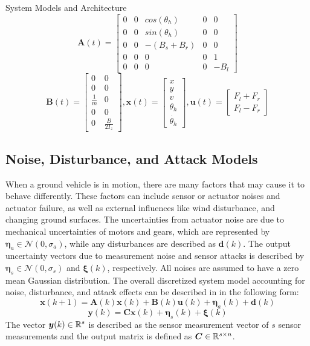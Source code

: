 \begin{section}{System Models and Architecture}
    \begin{equation}
	\bm{A}(t)=\begin{bmatrix} 0 & 0 & cos(\theta_h) & 0 & 0\\ 0 & 0 & sin(\theta_h) & 0 & 0 \\ 0 & 0 & -(B_s+B_r) & 0 & 0 \\ 0 & 0 & 0 & 0 & 1 \\ 0 & 0 & 0 & 0 & -B_l \end{bmatrix} \nonumber
	\end{equation}
	\begin{equation}
	\bm{B}(t)=\begin{bmatrix} 0 & 0 \\ 0 & 0 \\ \frac{1}{m} & 0 \\ 0 & 0 \\ 0 & \frac{B}{2I_z} \end{bmatrix}, 
     \bm{x}(t)=\begin{bmatrix} x \\ y \\ v \\ \theta_h \\ \dot{\theta_h} \end{bmatrix}, \bm{u}(t)= \begin{bmatrix} F_l+F_r \\ F_l-F_r  \end{bmatrix}  \nonumber
	\end{equation}




 \subsection{Noise, Disturbance, and Attack Models}
When a ground vehicle is in motion, there are many factors that may cause it to behave differently. These factors can include sensor or actuator noises and actuator failure, as well as external influences like wind disturbance, and changing ground surfaces. The uncertainties from actuator noise are due to mechanical uncertainties of motors and gears, which are represented by $ \bm{\eta}_a \in \mathcal{N}(0,\sigma_a) $, while any disturbances are described as $\bm{d}(k)$. The output uncertainty vectors due to measurement noise and sensor attacks is described by $ \bm{\eta}_s \in \mathcal{N}(0,\sigma_s) $ and $\bm{\xi}(k)$, respectively. All noises are assumed to have a zero mean Gaussian distribution. The overall discretized system model accounting for noise, disturbance, and attack effects  can be described in in the following form:
    \begin{equation}
	\bm{x}(k+1)=\bm{A}(k)\bm{x}(k)+\bm{B}(k)\bm{u}(k)+\bm{\eta}_a(k)+\bm{d}(k)
	\end{equation}
	\begin{equation}
	\bm{y}(k)=\bm{C}\bm{x}(k)+\bm{\eta}_s(k)+\bm{\xi}(k)
	\end{equation}
The vector $\bm{y}(k) \in \mathbb{R}^{s}$ is described as the sensor measurement vector of $s$ sensor measurements and the output matrix is defined as $\bm{C} \in \mathbb{R}^{s\times n}$.  







\end{section}
